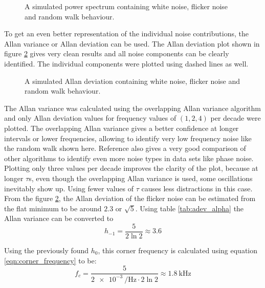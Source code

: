 \begin{figure}[hb]
    \centering
    
    \caption{A simulated power spectrum containing white noise, flicker noise and random walk behaviour.}
    \label{fig:adev_example_psd}
\end{figure}

To get an even better representation of the individual noise contributions, the Allan variance or Allan deviation can be used. The Allan deviation plot shown in figure \ref{fig:adev_example_adev} gives very clean results and all noise components can be clearly identified. The individual components were plotted using dashed lines as well.

\begin{figure}[ht]
    \centering
    
    \caption{A simulated Allan deviation containing white noise, flicker noise and random walk behaviour.}
    \label{fig:adev_example_adev}
\end{figure}

The Allan variance was calculated using the overlapping Allan variance algorithm \cite{oadev_definition} and only Allan deviation values for frequency values of $(1, 2, 4)$ per decade were plotted. The overlapping Allan variance gives a better confidence at longer intervals or lower frequencies, allowing to identify very low frequency noise like the random walk shown here. Reference \cite{oadev_definition} also gives a very good comparison of other algorithms to identify even more noise types in data sets like phase noise. Plotting only three values per decade improves the clarity of the plot, because at longer $\tau$s, even though the overlapping Allan variance is used, some oscillations inevitably show up. Using fewer values of $\tau$ causes less distractions in this case.
From the figure \ref{fig:adev_example_adev}, the Allan deviation of the flicker noise can be estimated from the flat minimum to be around $2.3$ or $\sqrt{5}$. Using table \ref{tab:adev_alpha} the Allan variance can be converted to
\begin{equation*}
    h_{-1} = \frac{5}{2 \ln 2} \approx 3.6
\end{equation*}

Using the previously found $h_0$, this corner frequency is calculated using equation \ref{eqn:corner_frequency} to be:
\begin{equation*}
    f_c = \frac{5}{\qty{2e-3}{\per \Hz} \cdot 2 \ln 2} \approx \qty{1.8}{\kHz}
\end{equation*}


